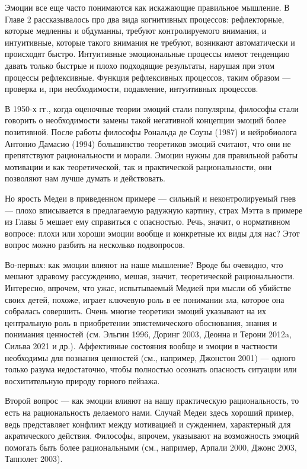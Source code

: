\documentclass[11pt]{book}
\begin{document}
Эмоции все еще часто понимаются как искажающие правильное мышление. В Главе 2 рассказывалось про два вида когнитивных процессов: рефлекторные, которые медленны и обдуманны, требуют контролируемого внимания, и интуитивные, которые такого внимания не требуют, возникают автоматически и происходят быстро. Интуитивные эмоциональные процессы имеют тенденцию давать только быстрые и плохо подходящие результаты, нарушая при этом процессы рефлексивные. Функция рефлексивных процессов, таким образом --- проверка и, при необходимости, подавление, интуитивных процессов.

В 1950-х гг., когда оценочные теории эмоций стали популярны, философы стали говорить о необходимости замены такой негативной концепции эмоций более позитивной. После работы философы Рональда де Соузы (1987) и нейробиолога Антонио Дамасио (1994) большинство теоретиков эмоций считают, что они не препятствуют рациональности и морали. Эмоции нужны для правильной работы мотивации и как теоретической, так и практической рациональности, они позволяют нам лучше думать и действовать.

Но ярость Медеи в приведенном примере --- сильный и неконтролируемый гнев --- плохо вписывается в предлагаемую радужную картину, страх Мэтта в примере из Главы 5 мешает ему справиться с опасностью. Речь, значит, о нормативном вопросе: плохи или хороши эмоции вообще и конкретные их виды для нас? Этот вопрос можно разбить на несколько подвопросов.

Во-первых: как эмоции влияют на наше мышление? Вроде бы очевидно, что мешают здравому рассуждению, мешая, значит, теоретической рациональности. Интересно, впрочем, что ужас, испытываемый Медией при мысли об убийстве своих детей, похоже, играет ключевую роль в ее понимании зла, которое она собралась совершить. Очень многие теоретики эмоций указывают на их центральную роль в приобретении эпистемического обоснования, знания и понимания ценностей (см. Эльгин 1996, Доринг 2003, Деонна и Терони 2012a, Сильва 2021 и др.). Аффективные состояния вообще и эмоции в частности необходимы для познания ценностей (см., например, Джонстон 2001) --- одного только разума недостаточно, чтобы полностью осознать опасность ситуации или восхитительную природу горного пейзажа.

Второй вопрос --- как эмоции влияют на нашу практическую рациональность, то есть на рациональность делаемого нами. Случай Медеи здесь хороший пример, ведь представляет конфликт между мотивацией и суждением, характерный для акратического действия. Философы, впрочем, указывают на возможность эмоций помогать быть более рациональными (см., например, Арпали 2000, Джонс 2003, Тапполет 2003).
\end{document}
